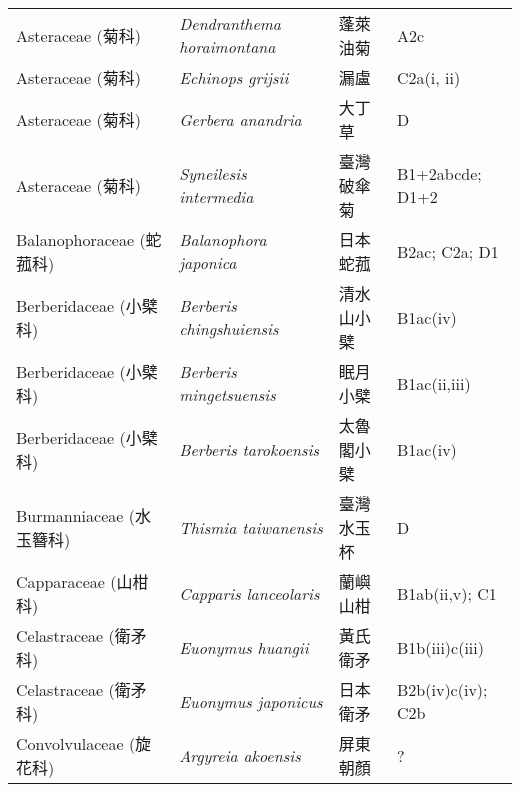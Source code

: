 \begin{longtable}{p{3cm}p{5cm}p{3cm}p{4cm}}
    Asteraceae (菊科) & \textit{Dendranthema horaimontana}  & 蓬萊油菊 & A2c \index{Dendranthema@\textit{Dendranthema}!horaimontana@\textit{horaimontana}}  \index{蓬萊油菊} \\
    Asteraceae (菊科) & \textit{Echinops grijsii}  & 漏盧 & C2a(i, ii) \index{Echinops@\textit{Echinops}!grijsii@\textit{grijsii}}  \index{漏盧} \\
    Asteraceae (菊科) & \textit{Gerbera anandria}  & 大丁草 & D \index{Gerbera@\textit{Gerbera}!anandria@\textit{anandria}}  \index{大丁草} \\
    Asteraceae (菊科) & \textit{Syneilesis intermedia}  & 臺灣破傘菊 & B1+2abcde; D1+2 \index{Syneilesis@\textit{Syneilesis}!intermedia@\textit{intermedia}}  \index{臺灣破傘菊} \\
    Balanophoraceae (蛇菰科) & \textit{Balanophora japonica}  & 日本蛇菰 & B2ac; C2a; D1 \index{Balanophora@\textit{Balanophora}!japonica@\textit{japonica}}  \index{日本蛇菰} \\
    Berberidaceae (小檗科) & \textit{Berberis chingshuiensis}  & 清水山小檗 & B1ac(iv) \index{Berberis@\textit{Berberis}!chingshuiensis@\textit{chingshuiensis}}  \index{清水山小檗} \\
    Berberidaceae (小檗科) & \textit{Berberis mingetsuensis}  & 眠月小檗 & B1ac(ii,iii) \index{Berberis@\textit{Berberis}!mingetsuensis@\textit{mingetsuensis}}  \index{眠月小檗} \\
    Berberidaceae (小檗科) & \textit{Berberis tarokoensis}  & 太魯閣小檗 & B1ac(iv) \index{Berberis@\textit{Berberis}!tarokoensis@\textit{tarokoensis}}  \index{太魯閣小檗} \\
    Burmanniaceae (水玉簪科) & \textit{Thismia taiwanensis}  & 臺灣水玉杯 & D \index{Thismia@\textit{Thismia}!taiwanensis@\textit{taiwanensis}}  \index{臺灣水玉杯} \\
    Capparaceae (山柑科) & \textit{Capparis lanceolaris}  & 蘭嶼山柑 & B1ab(ii,v); C1 \index{Capparis@\textit{Capparis}!lanceolaris@\textit{lanceolaris}}  \index{蘭嶼山柑} \\
    Celastraceae (衛矛科) & \textit{Euonymus huangii}  & 黃氏衛矛 & B1b(iii)c(iii) \index{Euonymus@\textit{Euonymus}!huangii@\textit{huangii}}  \index{黃氏衛矛} \\
    Celastraceae (衛矛科) & \textit{Euonymus japonicus}  & 日本衛矛 & B2b(iv)c(iv); C2b \index{Euonymus@\textit{Euonymus}!japonicus@\textit{japonicus}}  \index{日本衛矛} \\
    Convolvulaceae (旋花科) & \textit{Argyreia akoensis}  & 屏東朝顏 & ? \index{Argyreia@\textit{Argyreia}!akoensis@\textit{akoensis}}  \index{屏東朝顏} \\

\end{longtable}
